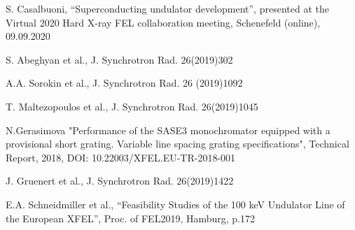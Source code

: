 \documentclass[aps,prl,preprint,groupedaddress,preprintnumbers]{revtex4}
\begin{document}
\begin{thebibliography}{99}
S. Casalbuoni, ``Superconducting undulator development'', presented at the
Virtual 2020 Hard X-ray FEL collaboration meeting, Schenefeld (online), 09.09.2020

S. Abeghyan et al., J. Synchrotron Rad. 26(2019)302

A.A. Sorokin et al., 
J. Synchrotron Rad. 26 (2019)1092

T. Maltezopoulos et al., J. Synchrotron Rad. 26(2019)1045

N.Gerasimova "Performance of the SASE3 monochromator equipped with a provisional short grating.
Variable line spacing grating specifications", Technical Report, 2018, DOI: 10.22003/XFEL.EU-TR-2018-001

J. Gruenert et al., 
J. Synchrotron Rad. 26(2019)1422

E.A. Schneidmiller et al., 
``Feasibility Studies of the 100 keV Undulator Line of the European XFEL'',
Proc. of FEL2019, Hamburg, p.172


\end{thebibliography}
\end{document}

